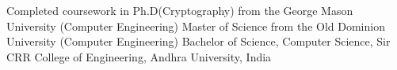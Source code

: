 %
%
%


\begin{scholarship}
					{
Completed coursework in Ph.D(Cryptography) from the George Mason University (Computer Engineering)}
					{
Master of Science from the Old Dominion University (Computer Engineering)}
					{Bachelor of Science, Computer Science, Sir CRR College of Engineering, Andhra University, India}

\end{scholarship}